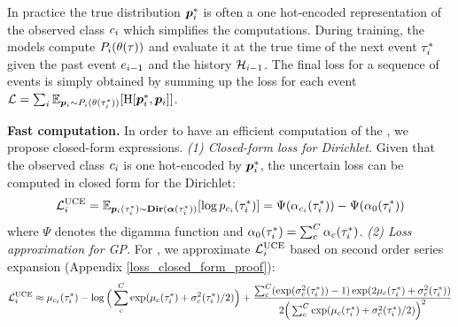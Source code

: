 In practice the true distribution $\bm{p}_{i}^*$ is often a one hot-encoded representation of the observed class $c_{i}$ which simplifies the computations. During training, the models compute $P_{i}(\theta(\tau))$ and evaluate it at the true time of the next event $\tau_{i}^*$ given the past event $e_{i-1}$ and the history $\mathcal{H}_{i-1}$. The final loss for a sequence of events is simply obtained by summing up the loss for each event
$\mathcal{L}=\sum_i \operatorname{\mathbb{E}}_{\bm{p}_{i} \sim P_{i}(\theta(\tau_{i}^*))}[\operatorname{H}[\bm{p}_{i}^*, \bm{p}_{i}]]$.

\textbf{Fast computation.}  In order to have an efficient computation of the \UncertaintyLoss, we propose closed-form expressions.
\textit{(1) Closed-form loss for Dirichlet.} Given that the observed class $c_i$ is one hot-encoded by $\bm{p}_i^*$, the uncertain loss can be computed in closed form for the Dirichlet:
\begin{equation} \label{eq:dir_loss}
\mathcal{L}_i^{\text{UCE}} = \operatorname{\mathbb{E}}_{\bm{p}_i(\tau_i^*) \sim \textbf{Dir}(\bm{\alpha}(\tau_i^*))}[\log p_{c_i}(\tau_i^*)] = \Psi(\alpha_{c_i}(\tau_i^*)) - \Psi(\alpha_0(\tau_i^*))
\end{equation}
where $\Psi$ denotes the digamma function and $\alpha_0(\tau_i^*) = \sum_c^C \alpha_c(\tau_i^*)$.
\textit{(2) Loss approximation for GP.} For \GPModel, we approximate $ \mathcal{L}_i^{\text{UCE}}$ based on second order series expansion (Appendix \ref{loss_closed_form_proof}):
\small
\begin{equation} \label{eq:gp_loss}
    \mathcal{L}_i^{\text{UCE}}
    \approx \mu_{c_i}(\tau_i^*) - \log \Big( \sum_c^C \exp(\mu_c(\tau_i^*) + \sigma_c^2(\tau_i^*) / 2) \Big) +
        \frac{\sum_c^C (\exp(\sigma_c^2(\tau_i^*)) - 1) \exp(2 \mu_c(\tau_i^*) + \sigma_c^2(\tau_i^*))}
        {2 \Big( \sum_c^C \exp(\mu_c(\tau_i^*) + \sigma_c^2(\tau_i^*) / 2) \Big)^2}
\end{equation}
\normalsize

